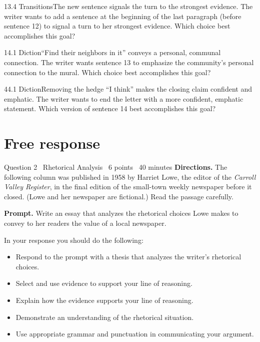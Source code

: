 \documentclass[11pt]{article}
\begin{document}
\begin{q}{1}{3.4 Transitions}{The new sentence signals the turn to the strongest evidence.}
The writer wants to add a sentence at the beginning of the last paragraph (before sentence 12) to signal a turn to her strongest evidence. Which choice best accomplishes this goal?
\end{q}

\begin{q}{1}{4.1 Diction}{``Find their neighbors in it'' conveys a personal, communal connection.}
The writer wants sentence 13 to emphasize the community's personal connection to the mural. Which choice best accomplishes this goal?
\end{q}

\begin{q}{4}{4.1 Diction}{Removing the hedge ``I think'' makes the closing claim confident and emphatic.}
The writer wants to end the letter with a more confident, emphatic statement. Which version of sentence 14 best accomplishes this goal?
\end{q}

\section{Free response}

\begin{frq}{Question 2 \textperiodcentered\ Rhetorical Analysis \textperiodcentered\ 6 points \textperiodcentered\ 40 minutes}
\small
\textbf{Directions.} The following column was published in 1958 by Harriet Lowe, the editor of the \emph{Carroll Valley Register}, in the final edition of the small-town weekly newspaper before it closed. (Lowe and her newspaper are fictional.) Read the passage carefully.

\textbf{Prompt.} Write an essay that analyzes the rhetorical choices Lowe makes to convey to her readers the value of a local newspaper.

In your response you should do the following:
\begin{itemize}[leftmargin=1.5em,itemsep=1pt]
\item Respond to the prompt with a thesis that analyzes the writer's rhetorical choices.
\item Select and use evidence to support your line of reasoning.
\item Explain how the evidence supports your line of reasoning.
\item Demonstrate an understanding of the rhetorical situation.
\item Use appropriate grammar and punctuation in communicating your argument.
\end{itemize}
\end{frq}
\end{document}
